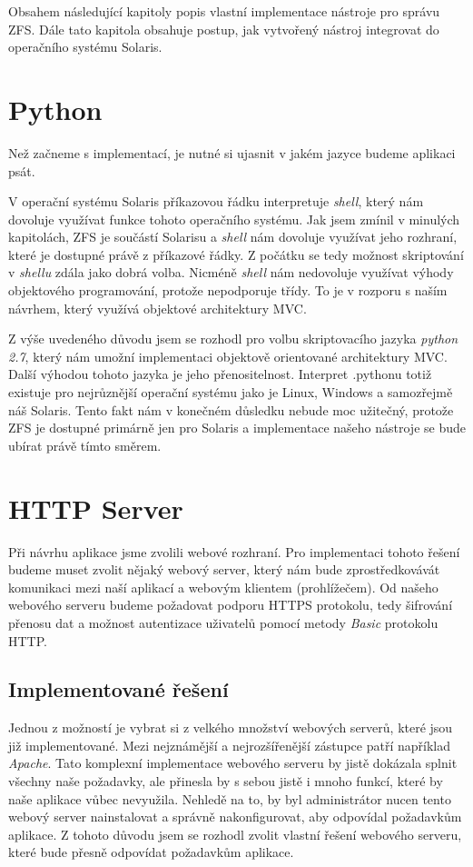 Obsahem následující kapitoly popis vlastní implementace nástroje pro správu ZFS. Dále tato kapitola obsahuje postup, jak vytvořený nástroj integrovat do operačního systému Solaris.
\section{Python}
Než začneme s implementací, je nutné si ujasnit v jakém jazyce budeme aplikaci psát.

V operační systému Solaris příkazovou řádku interpretuje \emph{shell}, který nám dovoluje využívat funkce tohoto operačního systému. Jak jsem zmínil v minulých kapitolách, ZFS je součástí Solarisu a \emph{shell} nám dovoluje využívat jeho rozhraní, které je dostupné právě z příkazové řádky. Z počátku se tedy možnost skriptování v \emph{shellu} zdála jako dobrá volba. Nicméně \emph{shell} nám nedovoluje využívat výhody objektového programování, protože nepodporuje třídy. To je v rozporu s naším návrhem, který využívá objektové architektury MVC.

Z výše uvedeného důvodu jsem se rozhodl pro volbu skriptovacího jazyka \emph{python 2.7}, který nám umožní implementaci objektově orientované architektury MVC. Další výhodou tohoto jazyka je jeho přenositelnost. Interpret \emph.{pythonu} totiž existuje pro nejrůznější operační systému jako je Linux, Windows a samozřejmě náš Solaris. Tento fakt nám v konečném důsledku nebude moc užitečný, protože ZFS je dostupné primárně jen pro Solaris a implementace našeho nástroje se bude ubírat právě tímto směrem.
\section{HTTP Server}
Při návrhu aplikace jsme zvolili webové rozhraní. Pro implementaci tohoto řešení budeme muset zvolit nějaký webový server, který nám bude zprostředkovávát komunikaci mezi naší aplikací a webovým klientem (prohlížečem). Od našeho webového serveru budeme požadovat podporu HTTPS protokolu, tedy šifrování přenosu dat a možnost autentizace uživatelů pomocí metody \emph{Basic} protokolu HTTP.
    \subsection{Implementované řešení}
    Jednou z možností je vybrat si z velkého množství webových serverů, které jsou již implementované. Mezi nejznámější a nejrozšířenější zástupce patří například \emph{Apache}. Tato komplexní implementace webového serveru by jistě dokázala splnit všechny naše požadavky, ale přinesla by s sebou jistě i mnoho funkcí, které by naše aplikace vůbec nevyužila. Nehledě na to, by byl administrátor nucen tento webový server nainstalovat a správně nakonfigurovat, aby odpovídal požadavkům aplikace. Z tohoto důvodu jsem se rozhodl zvolit vlastní řešení webového serveru, které bude přesně odpovídat požadavkům aplikace.
